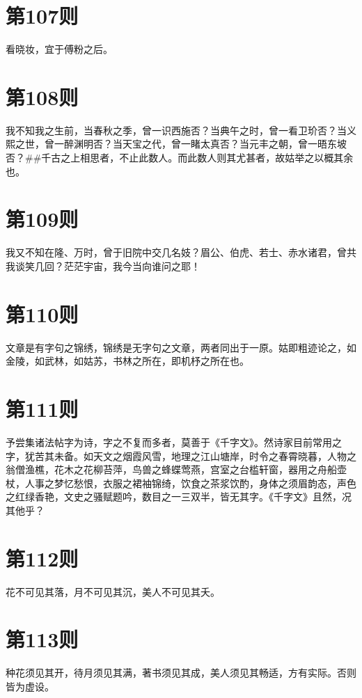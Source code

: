 \documentclass[12pt,a4paper]{ctexbook}
\begin{document}
\section{第107则}
看晓妆，宜于傅粉之后。\par

\section{第108则}
我不知我之生前，当春秋之季，曾一识西施否？当典午之时，曾一看卫玠否？当义熙之世，曾一醉渊明否？当天宝之代，曾一睹太真否？当元丰之朝，曾一晤东坡否？\#\#千古之上相思者，不止此数人。而此数人则其尤甚者，故姑举之以概其余也。\par

\section{第109则}
我又不知在隆、万时，曾于旧院中交几名妓？眉公、伯虎、若士、赤水诸君，曾共我谈笑几回？茫茫宇宙，我今当向谁问之耶！\par

\section{第110则}
文章是有字句之锦绣，锦绣是无字句之文章，两者同出于一原。姑即粗迹论之，如金陵，如武林，如姑苏，书林之所在，即机杼之所在也。\par

\section{第111则}
予尝集诸法帖字为诗，字之不复而多者，莫善于《千字文》。然诗家目前常用之字，犹苦其未备。如天文之烟霞风雪，地理之江山塘岸，时令之春霄晓暮，人物之翁僧渔樵，花木之花柳苔萍，鸟兽之蜂蝶莺燕，宫室之台槛轩窗，器用之舟船壶杖，人事之梦忆愁恨，衣服之裙袖锦绮，饮食之茶浆饮酌，身体之须眉韵态，声色之红绿香艳，文史之骚赋题吟，数目之一三双半，皆无其字。《千字文》且然，况其他乎？\par

\section{第112则}
花不可见其落，月不可见其沉，美人不可见其夭。\par

\section{第113则}
种花须见其开，待月须见其满，著书须见其成，美人须见其畅适，方有实际。否则皆为虚设。\par
\end{document}
